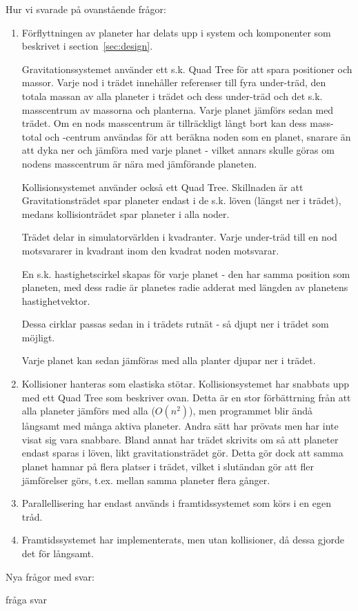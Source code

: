 
Hur vi svarade på ovanstående frågor:
\begin{enumerate}
    \item Förflyttningen av planeter har delats upp i system och komponenter
        som beskrivet i section~\ref{sec:design}.

        \vspace{6pt}

        Gravitationssystemet använder ett s.k. Quad Tree för att
        spara positioner och massor.
        Varje nod i trädet innehåller referenser till fyra under-träd, 
        den totala massan av alla planeter i trädet och dess under-träd
        och det s.k. masscentrum av massorna och planterna.
        Varje planet jämförs sedan med trädet.
        Om en nods masscentrum är tillräckligt långt bort kan
        dess mass-total och -centrum
        användas för att beräkna noden som en planet, snarare än att
        dyka ner och jämföra med varje planet - vilket annars skulle göras
        om nodens masscentrum är nära med jämförande planeten.

        \vspace{6pt}

        Kollisionsystemet använder också ett Quad Tree.
        Skillnaden är att Gravitationsträdet spar planeter endast i
        de s.k. löven (längst ner i trädet), medans kollisionträdet
        spar planeter i alla noder.

        Trädet delar in simulatorvärlden i kvadranter.
        Varje under-träd till en nod motsvararer in kvadrant inom
        den kvadrat noden motsvarar.

        En s.k. hastighetscirkel skapas för varje planet - 
        den har samma position som planeten, med dess radie
        är planetes radie adderat med längden av planetens hastighetvektor.

        Dessa cirklar passas sedan in i trädets rutnät - så djupt ner i
        trädet som möjligt.

        Varje planet kan sedan jämföras med alla planter djupar ner i trädet.

    \item Kollisioner hanteras som elastiska stötar.
        Kollisionsystemet har snabbats upp med ett Quad Tree som beskriver
        ovan. Detta är en stor förbättrning från att alla planeter
        jämförs med alla ($O(n^2)$), men programmet blir ändå långsamt med
        många aktiva planeter.
        Andra sätt har prövats men har inte visat sig vara snabbare.
        Bland annat har trädet skrivits om så att planeter endast sparas
        i löven, likt gravitationsträdet gör. Detta gör
        dock att samma planet hamnar på flera platser i trädet, vilket
        i slutändan gör att fler jämförelser görs, t.ex. mellan samma
        planeter flera gånger.
    \item Parallellisering har endast används i framtidssystemet som körs i en egen tråd.
    \item Framtidssystemet har implementerats, men utan kollisioner,
        då dessa gjorde det för långsamt.
\end{enumerate}

Nya frågor med svar:

\begin{Description}
    \item[fråga] svar %
\end{Description}
